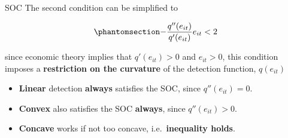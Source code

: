 \documentclass[
  ignorenonframetext,
  aspectratio=169,
]{beamer}
\providecommand{\tightlist}{%
  \setlength{\itemsep}{0pt}\setlength{\parskip}{0pt}}
\begin{document}
\begin{frame}{SOC}
\protect{}\label{soc-2}
The second condition can be simplified to

\begin{equation}\protect\phantomsection\label{eq-soc-e-qs}{
-\frac{q''(e_{it})}{q'(e_{it})}e_{it} < 2
}\end{equation}

since economic theory implies that \(q'(e_{it})>0\) and \(e_{it}>0\),
this condition imposes a \textbf{restriction on the curvature} of the
detection function, \(q(e_{it})\)

\begin{itemize}
\tightlist
\item
  \textbf{Linear} detection \textbf{always} satisfies the SOC, since
  \(q''(e_{it})=0\).
\item
  \textbf{Convex} also satisfies the SOC \textbf{always}, since
  \(q''(e_{it})>0\).
\item
  \textbf{Concave} works if not too concave, i.e.~\textbf{inequality
  holds}.
\end{itemize}
\end{frame}
\end{document}
